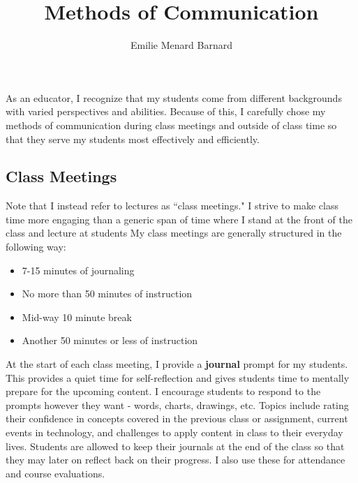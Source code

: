 \documentclass[12pt]{amsart} \usepackage{amssymb}
\title[]{Methods of Communication}
\author[]{Emilie Menard Barnard}
\begin{document}
\maketitle
\thispagestyle{empty}

As an educator, I recognize that my students come from different backgrounds with varied perspectives and abilities. Because of this, I carefully chose my methods of communication during class meetings and outside of class time so that they serve my students most effectively and efficiently.

\subsection*{Class Meetings}
Note that I instead refer to lectures as ``class meetings." I strive to make class time more engaging than a generic span of time where I stand at the front of the class and lecture at students My class meetings are generally structured in the following way: 
\begin{itemize}
\item 7-15 minutes of journaling
\item No more than 50 minutes of instruction
\item Mid-way 10 minute break
\item Another 50 minutes or less of instruction
\end{itemize}

At the start of each class meeting, I provide a \textbf{journal} prompt for my students. This provides a quiet time for self-reflection and gives students time to mentally prepare for the upcoming content. I encourage students to respond to the prompts however they want - words, charts, drawings, etc. Topics include rating their confidence in concepts covered in the previous class or assignment, current events in technology, and challenges to apply content in class to their everyday lives. Students are allowed to keep their journals at the end of the class so that they may later on reflect back on their progress. I also use these for attendance and course evaluations.
\end{document}
